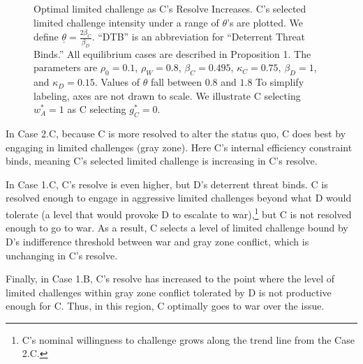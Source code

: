\documentclass[11pt,letterpaper,pdftex,dvipsnames,table]{article}
\begin{document}
\begin{figure}[h]
    \caption{Optimal limited challenge as C's Resolve Increases. C's selected limited challenge intensity under a range of $\theta$'s are plotted. We define $\underline{\theta}=\frac{2\beta_{C}}{\beta_{D}}$. ``DTB'' is an abbreviation for ``Deterrent Threat Binds.'' All equilibrium cases are described in Proposition 1. The parameters are $\rho_0=0.1$, $\rho_W=0.8$, $\beta_C=0.495$, $\kappa_{C}=0.75$, $\beta_D=1$, and $\kappa_D=0.15$. Values of $\theta$ fall between $0.8$ and $1.8$ To simplify labeling, axes are not drawn to scale. We illustrate C selecting $w_{A}^{*}=1$ as C selecting $g_{C}^{*}=0.$}
    \label{fig:optimalresolveincrease}
    \end{figure}

In Case 2.C, because C is more resolved to alter the status quo, C does best by engaging in limited challenges (gray zone). Here C's internal efficiency constraint binds, meaning C's selected limited challenge is increasing in C's resolve.

In Case 1.C, C's resolve is even higher, but D's deterrent threat binds. C is resolved enough to engage in aggressive limited challenges beyond what D would tolerate (a level that would provoke D to escalate to war),\footnote{C's nominal willingness to challenge grows along the trend line from the Case 2.C.} but C is not resolved enough to go to war. As a result, C selects a level of limited challenge bound by D's indifference threshold between war and gray zone conflict, which is unchanging in C's resolve.

Finally, in Case 1.B, C's resolve has increased to the point where the level of limited challenges within gray zone conflict tolerated by D is not productive enough for C. Thus, in this region, C optimally goes to war over the issue.
\end{document}
